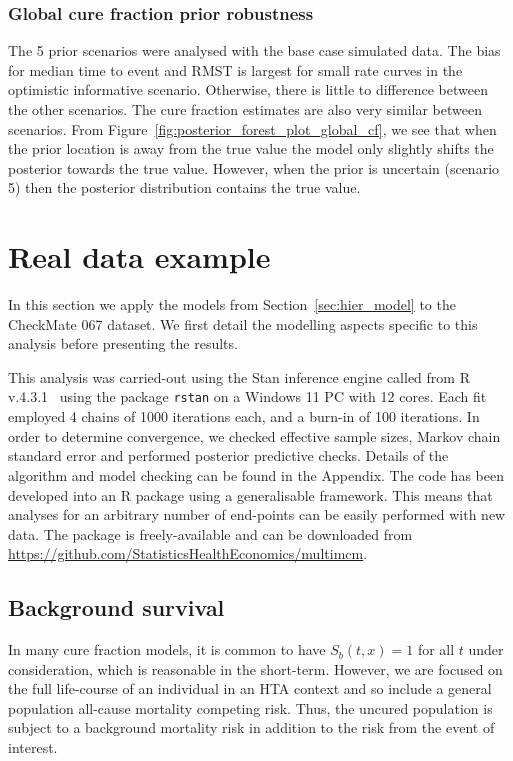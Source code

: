 \documentclass[AMA,STIX1COL]{WileyNJD-v2}
\begin{document}
\subsubsection{Global cure fraction prior robustness}
The 5 prior scenarios were analysed with the base case simulated data. The bias for median time to event and RMST is largest for small rate curves in the optimistic informative scenario. Otherwise, there is little to difference between the other scenarios. The cure fraction estimates are also very similar between scenarios. From Figure~\ref{fig:posterior_forest_plot_global_cf}, we see that when the prior location is away from the true value the model only slightly shifts the posterior towards the true value. However, when the prior is uncertain (scenario 5) then the posterior distribution contains the true value.

%
\section{Real data example}\label{sec:application}
In this section we apply the models from Section~\ref{sec:hier_model} to the CheckMate 067 dataset. We first detail the modelling aspects specific to this analysis before presenting the results.

This analysis was carried-out using the Stan inference engine \cite{carpenter2017stan} called from R v.4.3.1~\cite{Rcoreteam} using the package \texttt{rstan} on a Windows 11 PC with 12 cores. Each fit employed 4 chains of 1000 iterations each, and a burn-in of 100 iterations. In order to determine convergence, we checked effective sample sizes, Markov chain standard error and performed posterior predictive checks. Details of the algorithm and model checking can be found in the Appendix.
The code has been developed into an R package using a generalisable framework. This means that analyses for an arbitrary number of end-points can be easily performed with new data. The package is freely-available and can be downloaded from \url{https://github.com/StatisticsHealthEconomics/multimcm}.

%
\subsection{Background survival}
In many cure fraction models, it is common to have $S_b(t, x) = 1$ for all $t$ under consideration, which is reasonable in the short-term.
However, we are focused on the full life-course of an individual in an HTA context and so include a general population all-cause mortality competing risk.
Thus, the uncured population is subject to a background mortality risk in addition to the risk from the event of interest.
\end{document}
